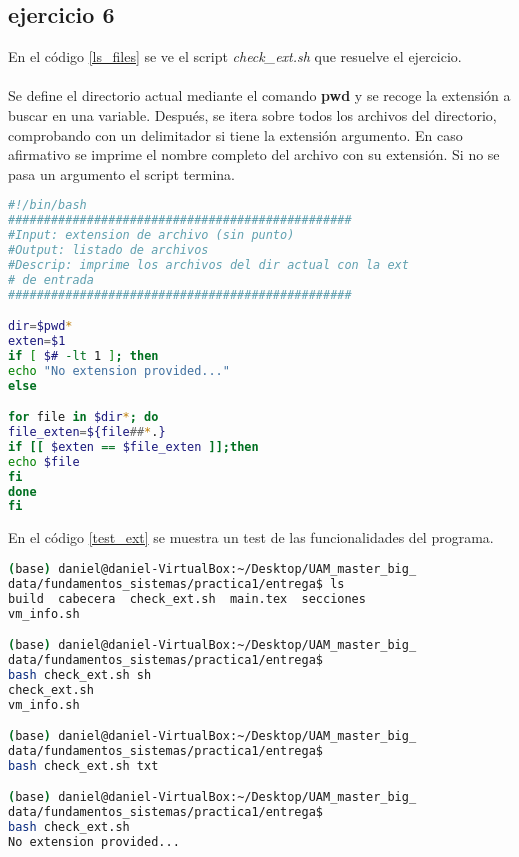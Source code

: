 \subsection*{ejercicio 6}
%
En el código \ref{ls_files} se ve el script \textit{check\_ext.sh} que resuelve el ejercicio.\\\\
Se define el directorio actual mediante el comando \textbf{pwd} y se recoge la extensión a buscar en una variable. Después, se itera sobre todos los archivos del directorio, comprobando con un delimitador si tiene la extensión argumento. En caso afirmativo se imprime el nombre completo del archivo con su extensión. Si no se pasa un argumento el script termina.  
\begin{lstlisting}[language=bash,caption={Script para listar archivos con una extensión dada}, label={ls_files}]
#!/bin/bash
################################################
#Input: extension de archivo (sin punto)
#Output: listado de archivos
#Descrip: imprime los archivos del dir actual con la ext
# de entrada
################################################

dir=$pwd*
exten=$1
if [ $# -lt 1 ]; then
echo "No extension provided..."
else

for file in $dir*; do
file_exten=${file##*.}
if [[ $exten == $file_exten ]];then
echo $file
fi
done
fi

\end{lstlisting}
En el código \ref{test_ext} se muestra un test de las funcionalidades del programa.
\begin{lstlisting}[language=bash,caption={Test del script \textit{check\_ext.sh}}, label={test_ext}]
(base) daniel@daniel-VirtualBox:~/Desktop/UAM_master_big_
data/fundamentos_sistemas/practica1/entrega$ ls
build  cabecera  check_ext.sh  main.tex  secciones  
vm_info.sh

(base) daniel@daniel-VirtualBox:~/Desktop/UAM_master_big_
data/fundamentos_sistemas/practica1/entrega$ 
bash check_ext.sh sh
check_ext.sh
vm_info.sh

(base) daniel@daniel-VirtualBox:~/Desktop/UAM_master_big_
data/fundamentos_sistemas/practica1/entrega$ 
bash check_ext.sh txt

(base) daniel@daniel-VirtualBox:~/Desktop/UAM_master_big_
data/fundamentos_sistemas/practica1/entrega$ 
bash check_ext.sh 
No extension provided...
\end{lstlisting}
